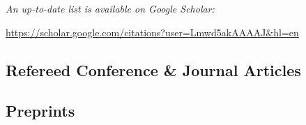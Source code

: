 \begin{center}
\emph{An up-to-date list is available on Google Scholar:}

\url{https://scholar.google.com/citations?user=Lmwd5akAAAAJ&hl=en}
\end{center}

\subsection{Refereed Conference \& Journal Articles}
\newrefcontext[labelprefix={A}]
\printbibliography[nottype={unpublished},notkeyword=talk,heading=none]

\subsection{Preprints}
\newrefcontext[labelprefix={PP}]
\printbibliography[type={unpublished},notkeyword=talk,heading=none]
